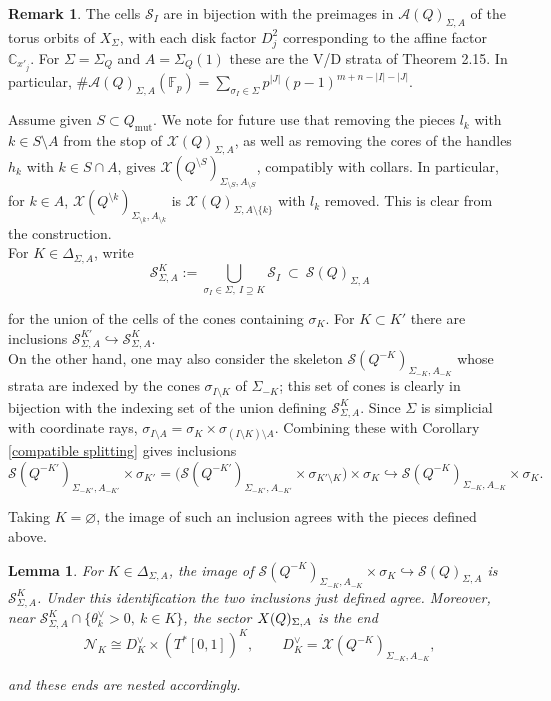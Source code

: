 \documentclass[11pt]{amsart}
\newtheorem{lem}[thm]{Lemma}
\theoremstyle{definition}
\newtheorem{rem}[thm]{Remark}
\theoremstyle{remark}
\newcommand{\X}{\mathcal{X}}
\renewcommand{\emptyset}{\varnothing}
\numberwithin{equation}{section}
\begin{document}
\begin{rem}
    The cells $\mathcal S_I$ are in bijection with the preimages in $\mathcal A(Q)_{\Sigma,A}$ of the torus orbits of $X_\Sigma$, with each disk factor $D^2_j$ corresponding to the affine factor $\mathbb C_{x'_j}$. For $\Sigma=\Sigma_Q$ and $A=\Sigma_Q(1)$ these are the V/D strata of Theorem 2.15. In particular, $\#\mathcal A(Q)_{\Sigma,A}(\mathbb F_p)=\sum_{\sigma_I\in\Sigma}p^{|J|}(p-1)^{m+n-|I|-|J|}$.
\end{rem}

Assume given $S\subset Q_{\mathrm{mut}}$. We note for future use that removing the pieces $l_k$ with $k\in S\setminus A$ from the stop of $\mathcal X(Q)_{\Sigma,A}$, as well as removing the cores of the handles $h_k$ with $k\in S\cap A$, gives $\mathcal X(Q^{\setminus S})_{\Sigma_{\setminus S},A_{\setminus S}}$, compatibly with collars. In particular, for $k\in A$, $\mathcal X(Q^{\setminus k})_{\Sigma_{\setminus k},A_{\setminus k}}$ is $\mathcal X(Q)_{\Sigma,A\setminus\{k\}}$ with $l_k$ removed. This is clear from the construction.\\

For $K\in\Delta_{\Sigma,A}$, write
$$\mathcal S^K_{\Sigma,A}:=\bigcup_{\sigma_I\in\Sigma,\ I\supseteq K}\mathcal S_I\ \subset\ \mathcal S(Q)_{\Sigma,A}$$

\noindent for the union of the cells of the cones containing $\sigma_K$. For $K\subset K'$ there are inclusions
$\mathcal S^{K'}_{\Sigma,A}\hookrightarrow\mathcal S^K_{\Sigma,A}.$\\

On the other hand, one may also consider the skeleton $\mathcal S(Q^{-K})_{\Sigma_{-K},A_{-K}}$ whose strata are indexed by the cones $\sigma_{I\setminus K}$ of $\Sigma_{-K}$; this set of cones is clearly in bijection with the indexing set of the union defining $\mathcal{S}^K_{\Sigma, A}$. Since $\Sigma$ is simplicial with coordinate rays, $\sigma_{I\setminus A}=\sigma_K\times\sigma_{(I\setminus K)\setminus A}$. Combining these with Corollary \ref{compatible splitting} gives inclusions
$$\mathcal S(Q^{-K'})_{\Sigma_{-K'},A_{-K'}}\times\sigma_{K'}=\bigl(\mathcal S(Q^{-K'})_{\Sigma_{-K'},A_{-K'}}\times\sigma_{K'\setminus K}\bigr)\times\sigma_K\hookrightarrow\mathcal S(Q^{-K})_{\Sigma_{-K},A_{-K}}\times\sigma_K .$$

Taking $K=\emptyset$, the image of such an inclusion agrees with the pieces defined above.

\begin{lem}
For $K\in\Delta_{\Sigma,A}$, the image of $\mathcal S(Q^{-K})_{\Sigma_{-K},A_{-K}}\times\sigma_K\hookrightarrow\mathcal S(Q)_{\Sigma,A}$ is $\mathcal S^K_{\Sigma,A}$. Under this identification the two inclusions just defined agree. Moreover, near $\mathcal S^K_{\Sigma,A}\cap\{\theta_k^\vee>0,\ k\in K\}$, the sector $\mathcal \X(Q)_{\Sigma,A}$ is the end
$$\mathcal N_K\cong D_K^\vee\times(T^*[0,1])^K,\qquad D_K^\vee=\mathcal X(Q^{-K})_{\Sigma_{-K},A_{-K}},$$

and these ends are nested accordingly.
\end{lem}
\end{document}
